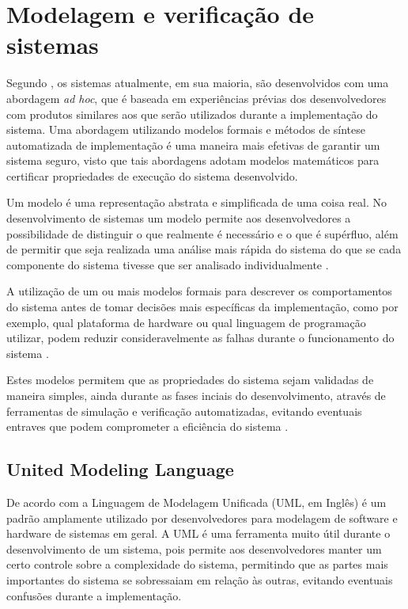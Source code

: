 
\section{Modelagem e verificação de sistemas}

Segundo , os sistemas atualmente, em sua maioria, são desenvolvidos com uma abordagem \textit{ad hoc}, que é baseada em experiências prévias dos desenvolvedores com produtos similares aos que serão utilizados durante a implementação do sistema. Uma abordagem utilizando modelos formais e métodos de síntese automatizada de implementação é uma maneira mais efetivas de garantir um sistema seguro, visto que tais abordagens adotam modelos matemáticos para certificar propriedades de execução do sistema desenvolvido. 

Um modelo é uma representação abstrata e simplificada de uma coisa real. No desenvolvimento de sistemas um modelo permite aos desenvolvedores a possibilidade de distinguir o que realmente é necessário e o que é supérfluo, além de permitir que seja realizada uma análise mais rápida do sistema do que se cada componente do sistema tivesse que ser analisado individualmente \cite{UML:2006}.

A utilização de um ou mais modelos formais para descrever os comportamentos do sistema antes de tomar decisões mais específicas da implementação, como por exemplo, qual plataforma de hardware ou qual linguagem de programação utilizar, podem reduzir consideravelmente as falhas durante o funcionamento do sistema \cite{edwards:1997}.

Estes modelos permitem que as propriedades do sistema sejam validadas de maneira simples, ainda durante as fases inciais do desenvolvimento, através de ferramentas de simulação e verificação automatizadas, evitando eventuais entraves que podem comprometer a eficiência do sistema \cite{edwards:1997}.

\subsection{United Modeling Language}

De acordo com  a Linguagem de Modelagem Unificada (UML, em Inglês) é um padrão amplamente utilizado por desenvolvedores para modelagem de software e hardware de sistemas em geral. A UML é uma ferramenta muito útil durante o desenvolvimento de um sistema, pois permite aos desenvolvedores manter um certo controle sobre a complexidade do sistema, permitindo que as partes mais importantes do sistema se sobressaiam em relação às outras, evitando eventuais confusões durante a implementação.

